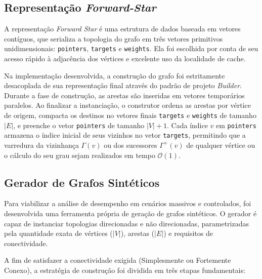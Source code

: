 \documentclass[12pt]{article}
\begin{document}
\subsection{Representação \textit{Forward-Star}} \label{forwardstar}

A representação \textit{Forward Star} é uma estrutura de dados baseada em vetores contíguos, que serializa a topologia do grafo em três vetores primitivos unidimensionais: \texttt{pointers}, \texttt{targets} e \texttt{weights}. Ela foi escolhida por conta de seu acesso rápido à adjacência dos vértices e excelente uso da localidade de cache.

Na implementação desenvolvida, a construção do grafo foi estritamente desacoplada de sua representação final através do padrão de projeto \textit{Builder}. Durante a fase de construção, as arestas são inseridas em vetores temporários paralelos. Ao finalizar a instanciação, o construtor ordena as arestas por vértice de origem, compacta os destinos no vetores finais \texttt{targets} e \texttt{weights} de tamanho $|E|$, e preenche o vetor \texttt{pointers} de tamanho $|V| + 1$. Cada índice $v$ em \texttt{pointers} armazena o índice inicial de seus vizinhos no vetor \texttt{targets}, permitindo que a varredura da vizinhança $\Gamma(v)$ ou dos sucessores $\Gamma^+(v)$ de qualquer vértice ou o cálculo do seu grau sejam realizados em tempo $\mathcal{O}(1)$.

\subsection{Gerador de Grafos Sintéticos} \label{gerador}

Para viabilizar a análise de desempenho em cenários massivos e controlados, foi desenvolvida uma ferramenta própria de geração de grafos sintéticos. O gerador é capaz de instanciar topologias direcionadas e não direcionadas, parametrizadas pela quantidade exata de vértices ($|V|$), arestas ($|E|$) e requisitos de conectividade.

A fim de satisfazer a conectividade exigida (Simplesmente ou Fortemente Conexo), a estratégia de construção foi dividida em três etapas fundamentais:
\end{document}
